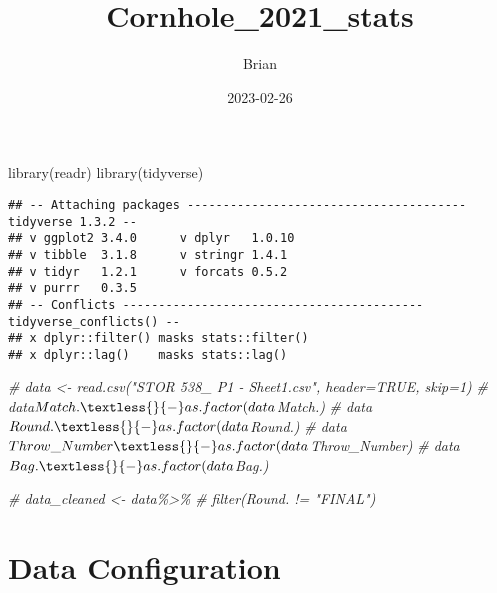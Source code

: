 \documentclass[
]{article}
\title{Cornhole\_2021\_stats}
\author{Brian}
\date{2023-02-26}
\newenvironment{Shaded}{\begin{snugshade}}{\end{snugshade}}
\newcommand{\CommentTok}[1]{\textcolor[rgb]{0.56,0.35,0.01}{\textit{#1}}}
\newcommand{\FunctionTok}[1]{\textcolor[rgb]{0.00,0.00,0.00}{#1}}
\newcommand{\NormalTok}[1]{#1}
\begin{document}
\maketitle

\begin{Shaded}
\begin{Highlighting}[]
\FunctionTok{library}\NormalTok{(readr)}
\FunctionTok{library}\NormalTok{(tidyverse)}
\end{Highlighting}
\end{Shaded}

\begin{verbatim}
## -- Attaching packages --------------------------------------- tidyverse 1.3.2 --
## v ggplot2 3.4.0      v dplyr   1.0.10
## v tibble  3.1.8      v stringr 1.4.1 
## v tidyr   1.2.1      v forcats 0.5.2 
## v purrr   0.3.5      
## -- Conflicts ------------------------------------------ tidyverse_conflicts() --
## x dplyr::filter() masks stats::filter()
## x dplyr::lag()    masks stats::lag()
\end{verbatim}

\begin{Shaded}
\begin{Highlighting}[]
\CommentTok{\# data \textless{}{-} read.csv("STOR 538\_ P1 {-} Sheet1.csv", header=TRUE, skip=1)}
\CommentTok{\# data$Match. \textless{}{-} as.factor(data$Match.)}
\CommentTok{\# data$Round. \textless{}{-} as.factor(data$Round.)}
\CommentTok{\# data$Throw\_Number \textless{}{-} as.factor(data$Throw\_Number)}
\CommentTok{\# data$Bag. \textless{}{-} as.factor(data$Bag.)}


\CommentTok{\# data\_cleaned \textless{}{-} data\%\textgreater{}\%}
\CommentTok{\# filter(Round. != "FINAL")}
\end{Highlighting}
\end{Shaded}

\hypertarget{data-configuration}{%
\section{Data Configuration}\label{data-configuration}}
\end{document}
